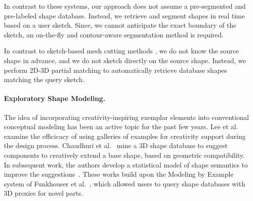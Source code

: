 In contrast to these systems, our approach does not assume a pre-segmented and pre-labeled shape database. Instead, we retrieve and segment shapes in real time based on a user sketch. Since, we cannot anticipate the exact boundary of the sketch, an on-the-fly and contour-aware segmentation method is required.

In contrast to sketch-based mesh cutting methods \cite{FanMeshCutting2012}, we do not know the source shape in advance, and we do not sketch directly on the source shape. Instead, we perform 2D-3D partial matching to automatically retrieve database shapes matching the query sketch.


\paragraph*{Exploratory Shape Modeling.} The idea of incorporating creativity-inspiring exemplar elements into conventional conceptual modeling has been an active topic for the past few years. Lee et al.  examine the efficicacy of using galleries of examples for creativity support during the design process. Chaudhuri et al.~ mine a 3D shape database to suggest components to creatively extend a base shape, based on geometric compatibility. In subsequent work, the authors develop a statistical model of shape semantics to improve the suggestions~\cite{probabilisticreasoningvladlensg2011}. These works build upon the Modeling by Example system of Funkhouser et al.~, which allowed users to query shape databases with 3D proxies for novel parts.
